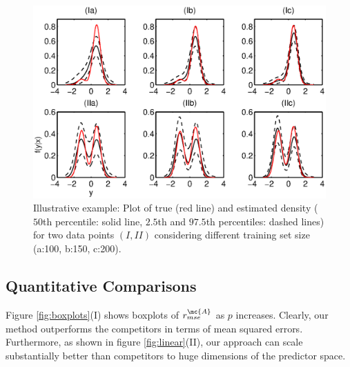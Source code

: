 \begin{figure}[h!]
\centering
 \vskip -10pt 
\includegraphics[width=120mm]{../figs/ch3_density.eps}
 \vskip -15pt 
\caption{Illustrative example: Plot of true (red line) and estimated density ($50$th percentile: solid line, $2.5$th and $97.5$th percentiles: dashed lines) for two data points $(I, II)$ considering different training set size (a:100, b:150, c:200). } \label{plotDensity}
\end{figure}




\subsection{Quantitative Comparisons} 


Figure \ref{fig:boxplots}(I) shows boxplots of $r_{mse}^{\mc{A}}$ as $p$ increases. Clearly, our method outperforms the competitors in terms of mean squared errors. Furthermore, as shown in figure \ref{fig:linear}(II), our approach can scale substantially better than competitors to huge dimensions of the predictor space. 




